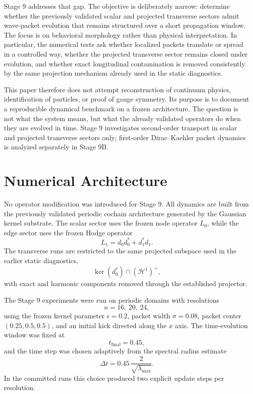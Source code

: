 \documentclass[11pt]{article}
\begin{document}
Stage 9 addresses that gap. The objective is deliberately narrow: determine whether the previously validated scalar and projected transverse sectors admit wave-packet evolution that remains structured over a short propagation window. The focus is on behavioral morphology rather than physical interpretation. In particular, the numerical tests ask whether localized packets translate or spread in a controlled way, whether the projected transverse sector remains closed under evolution, and whether exact longitudinal contamination is removed consistently by the same projection mechanism already used in the static diagnostics.

This paper therefore does not attempt reconstruction of continuum physics, identification of particles, or proof of gauge symmetry. Its purpose is to document a reproducible dynamical benchmark on a frozen architecture. The question is not what the system means, but what the already validated operators do when they are evolved in time. Stage 9 investigates second-order transport in scalar and projected transverse sectors only; first-order Dirac--Kaehler packet dynamics is analyzed separately in Stage 9B.

\section{Numerical Architecture}
No operator modification was introduced for Stage 9. All dynamics are built from the previously validated periodic cochain architecture generated by the Gaussian kernel substrate. The scalar sector uses the frozen node operator $L_0$, while the edge sector uses the frozen Hodge operator
\begin{equation}
L_1 = d_0 d_0^{*} + d_1^{*} d_1.
\end{equation}
The transverse runs are restricted to the same projected subspace used in the earlier static diagnostics,
\begin{equation}
\ker(d_0^{*}) \cap (\mathcal{H}^1)^\perp,
\end{equation}
with exact and harmonic components removed through the established projector.

The Stage 9 experiments were run on periodic domains with resolutions
\begin{equation}
n = 16,\ 20,\ 24,
\end{equation}
using the frozen kernel parameter $\epsilon = 0.2$, packet width $\sigma = 0.08$, packet center $(0.25,0.5,0.5)$, and an initial kick directed along the $x$ axis. The time-evolution window was fixed at
\begin{equation}
t_{\mathrm{final}} = 0.45,
\end{equation}
and the time step was chosen adaptively from the spectral radius estimate
\begin{equation}
\Delta t = 0.45\,\frac{2}{\sqrt{\lambda_{\max}}}.
\end{equation}
In the committed runs this choice produced two explicit update steps per resolution.
\end{document}
